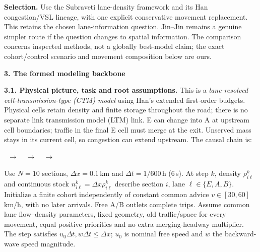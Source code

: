 \documentclass[11pt,a4paper]{article}
\newcommand{\head}[1]{\par\vspace{5pt}\noindent\textbf{#1}\par\nobreak\vspace{1pt}}
\begin{document}
\textbf{Selection.} Use the Subraveti lane-density framework and its Han
congestion/VSL lineage, with one explicit conservative movement replacement.
This retains the chosen lane-information question. Jin--Jin remains a
genuine simpler route if the question changes to spatial information.
The comparison concerns inspected methods, not a globally best-model claim;
the exact cohort/control scenario and movement composition below are ours.

\head{3. The formed modeling backbone}
\textbf{3.1. Physical picture, task and root assumptions.}
This is a \emph{lane-resolved cell-transmission-type (CTM) model} using
Han's extended first-order budgets. Physical cells retain density and finite
storage throughout the road; there is no separate link transmission model
(LTM) link. E can change into A at upstream cell boundaries; traffic in the
final E cell must merge at the exit.
Unserved mass stays in its current cell, so congestion can extend upstream.
The causal chain is:
\begin{center}
\ $\longrightarrow$\ \
$\longrightarrow$\ \ $\longrightarrow$\ 
\end{center}
Use $N=10$ sections, $\Delta x=0.1$\,km and $\Delta t=1/600$\,h (6\,s).
At step $k$, density $\rho^k_{i\ell}$ and continuous stock
$n^k_{i\ell}=\Delta x\rho^k_{i\ell}$ describe section $i$, lane
$\ell\in\{E,A,B\}$. Initialize a finite cohort independently of constant
common advice $v\in[30,60]$\,km/h, with no later arrivals. Free A/B outlets
complete trips. Assume common lane flow--density parameters, fixed geometry,
old traffic/space for every movement, equal positive priorities and no extra
merging-headway multiplier. The step satisfies $u_0\Delta t,w\Delta t\leq\Delta x$;
$u_0$ is nominal free speed and $w$ the backward-wave speed magnitude.
\end{document}
